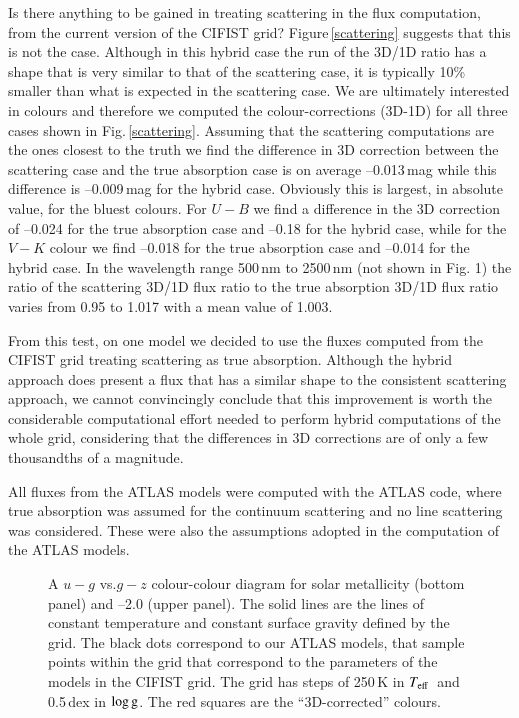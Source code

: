 \documentclass[]{aa}
\def\teff{$T\rm_{eff}$}
\newcommand{\glog}{\ensuremath{\log {\rm g}}}
\begin{document}
Is there anything to be gained in treating scattering
in the flux computation, from the current version of the CIFIST grid?
Figure\,\ref{scattering} suggests that this is not the case.
Although in this hybrid case the run of the 3D/1D ratio has a shape that
is very similar to that of the scattering case, it is typically
10\% smaller than what is expected in the scattering case.
We are ultimately interested in colours and therefore we computed
the colour-corrections (3D-1D) for all three cases
shown in Fig.\,\ref{scattering}.
Assuming that the scattering computations are the ones
closest to the truth we find 
the difference in 3D correction between
the  scattering  case  
and the true absorption case
is on average --0.013\,mag  while this difference is
 --0.009\,mag for the hybrid case. 
Obviously this is largest, in absolute value,  for the 
bluest colours. For $U-B$ we find a difference in the 3D correction
of --0.024 for the true absorption case and --0.18 for the hybrid
case, while for the $V-K$ colour we find --0.018 for the
true absorption case and --0.014  for the hybrid case. In the wavelength range 500\,nm to 2500\,nm (not shown in Fig. 1) 
the ratio of the scattering 3D/1D flux ratio to the true absorption 
3D/1D flux ratio varies from
0.95 to 1.017
with a mean value of 1.003.

From this test, on one model we decided to use the
fluxes computed from the CIFIST grid treating scattering
as true absorption. 
Although the hybrid approach does present
a flux that has a similar shape to the  consistent scattering
approach, we cannot convincingly conclude that this
improvement is worth the considerable computational effort needed to
perform hybrid computations of the whole grid, considering
that the differences in 3D corrections are of only a few thousandths
of a magnitude.

All fluxes from the ATLAS models were computed with the ATLAS code,
where true absorption was assumed for
the continuum scattering and no line scattering was 
considered. These were also the assumptions adopted in the computation
of the ATLAS models.


\begin{figure}
\centering
{}
\caption{A  $u-g$  vs.$g-z$ colour-colour diagram
for solar metallicity (bottom panel) and --2.0 (upper panel). 
The solid lines are the lines of constant temperature and
constant surface gravity defined by the \citet{CK03}
grid. The black dots correspond to our ATLAS models, that 
sample points within the \citet{CK03} grid that correspond
to the parameters of the models in the CIFIST grid. 
The \citet{CK03} grid has steps of 250\,K in \teff\ and 0.5\,dex
in \glog.
The red squares are the ``3D-corrected'' colours.
\label{ug_gz}}

\end{figure}
\end{document}

